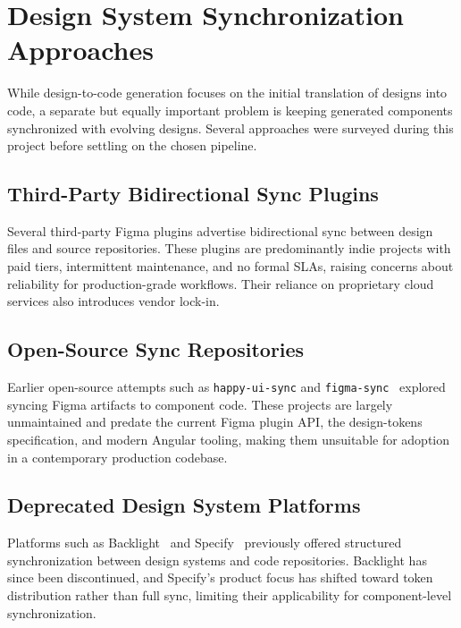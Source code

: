 \section{Design System Synchronization Approaches}

While design-to-code generation focuses on the initial translation of designs into code, a separate but equally important problem is keeping generated components synchronized with evolving designs. Several approaches were surveyed during this project before settling on the chosen pipeline.

\subsection{Third-Party Bidirectional Sync Plugins}
Several third-party Figma plugins advertise bidirectional sync between design files and source repositories. These plugins are predominantly indie projects with paid tiers, intermittent maintenance, and no formal SLAs, raising concerns about reliability for production-grade workflows. Their reliance on proprietary cloud services also introduces vendor lock-in.

\subsection{Open-Source Sync Repositories}
Earlier open-source attempts such as \texttt{happy-ui-sync} and \texttt{figma-sync}~\cite{happyUiSync} explored syncing Figma artifacts to component code. These projects are largely unmaintained and predate the current Figma plugin API, the design-tokens specification, and modern Angular tooling, making them unsuitable for adoption in a contemporary production codebase.

\subsection{Deprecated Design System Platforms}
Platforms such as Backlight~\cite{backlight} and Specify~\cite{specify} previously offered structured synchronization between design systems and code repositories. Backlight has since been discontinued, and Specify's product focus has shifted toward token distribution rather than full sync, limiting their applicability for component-level synchronization.

